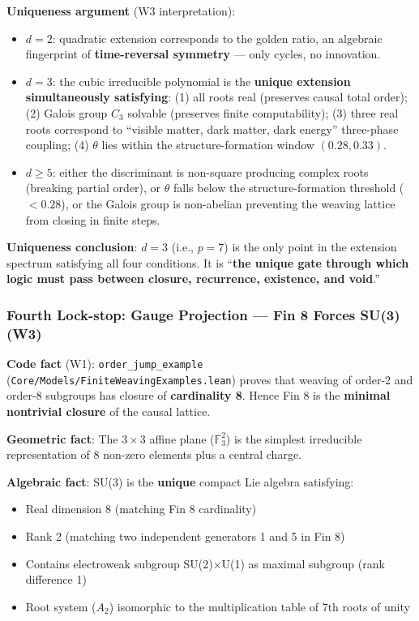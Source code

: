 \documentclass[aps,prd,twocolumn,nofootinbib,floatfix]{revtex4-2}
\begin{document}
\textbf{Uniqueness argument} (W3 interpretation):
\begin{itemize}
    \item $d=2$: quadratic extension corresponds to the golden ratio, an algebraic fingerprint of \textbf{time-reversal symmetry} --- only cycles, no innovation.
    \item $d=3$: the cubic irreducible polynomial is the \textbf{unique extension simultaneously satisfying}: (1) all roots real (preserves causal total order); (2) Galois group $C_3$ solvable (preserves finite computability); (3) three real roots correspond to ``visible matter, dark matter, dark energy'' three-phase coupling; (4) $\theta$ lies within the structure-formation window $(0.28, 0.33)$.
    \item $d\geq 5$: either the discriminant is non-square producing complex roots (breaking partial order), or $\theta$ falls below the structure-formation threshold ($<0.28$), or the Galois group is non-abelian preventing the weaving lattice from closing in finite steps.
\end{itemize}

\textbf{Uniqueness conclusion}: $d=3$ (i.e., $p=7$) is the only point in the extension spectrum satisfying all four conditions. It is ``\textbf{the unique gate through which logic must pass between closure, recurrence, existence, and void}.''

\subsubsection*{Fourth Lock-stop: Gauge Projection --- Fin 8 Forces SU(3) (W3)}

\textbf{Code fact} (W1): \texttt{order\_jump\_example} (\texttt{Core/Models/FiniteWeavingExamples.lean}) proves that weaving of order-2 and order-8 subgroups has closure of \textbf{cardinality 8}. Hence Fin 8 is the \textbf{minimal nontrivial closure} of the causal lattice.

\textbf{Geometric fact}: The $3\times 3$ affine plane ($\mathbb{F}_3^2$) is the simplest irreducible representation of 8 non-zero elements plus a central charge.

\textbf{Algebraic fact}: SU(3) is the \textbf{unique} compact Lie algebra satisfying:
\begin{itemize}
    \item Real dimension 8 (matching Fin 8 cardinality)
    \item Rank 2 (matching two independent generators 1 and 5 in Fin 8)
    \item Contains electroweak subgroup SU(2)$\times$U(1) as maximal subgroup (rank difference 1)
    \item Root system ($A_2$) isomorphic to the multiplication table of 7th roots of unity
\end{itemize}
\end{document}
